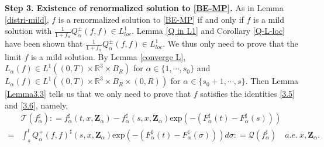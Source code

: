 \documentclass[reqno,11pt]{amsart}
\numberwithin{equation}{section}
\def\R{\mathbb{R}}
\def\exp{\mathrm{exp}}
\begin{document}
{\bf Step 3. Existence of renormalized solution to \eqref{BE-MP}.} As in Lemma \ref{distri-mild}, $f$ is a renormalized solution to \eqref{BE-MP} if and only if $f$ is a mild solution with $\frac{1}{1 + f_\alpha} Q^\pm_\alpha (f, f) \in L^1_{loc}$. Lemma \ref{Q in L1} and Corollary \ref{Q-L-loc} have been shown that $\frac{1}{1 + f_\alpha} Q^\pm_\alpha (f, f) \in L^1_{loc}$. We thus only need to prove that the limit $f$ is a mild solution. By Lemma \ref{converge L}, $L_\alpha (f) \in L^1 ( (0, T) \times \R^3 \times B_R )$ for $\alpha \in \{ 1, \cdots, s_0 \}$ and $L_\alpha (f) \in L^1 ( (0, T) \times \R^3 \times B_R \times (0, R) )$ for $\alpha \in \{ s_0 + 1, \cdots, s \}$. Then Lemma \ref{Lemma3.3} tells us that we only need to prove that $f$ satisfies the identities \eqref{3.5} and \eqref{3.6}, namely,
\begin{equation*}
  \begin{aligned}
    &\mathcal{T} (f_\alpha^\sharp) : = f^\sharp_\alpha (t,x,\mathbf{Z}_\alpha) -f^\sharp_\alpha (s,x,\mathbf{Z}_\alpha) \exp(-(F^\sharp _{\alpha} (t)-F^\sharp _{\alpha} (s)))\\
	=&\int_{s}^{t} Q^+_{\alpha } (f,f) ^\sharp (s,x,\mathbf{Z}_\alpha) \exp(-(F^\sharp _{\alpha } (t)- F^\sharp _{\alpha } (\sigma))) d\sigma : = \mathcal{Q} (f_\alpha^\sharp) \quad  a.e.\ x,\mathbf{Z}_\alpha.
  \end{aligned}
\end{equation*}
\end{document}
